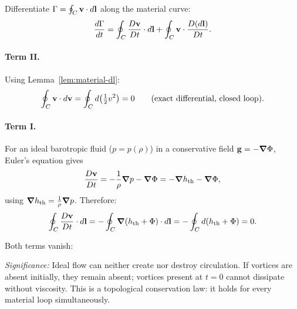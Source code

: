 \documentclass[../main.tex]{subfiles}
\begin{document}
Differentiate $\Gamma = \oint_C\mathbf{v}\cdot d\mathbf{l}$ along the material curve:
\begin{equation}
  \frac{d\Gamma}{dt}
  = \oint_C \frac{D\mathbf{v}}{Dt}\cdot d\mathbf{l}
  + \oint_C \mathbf{v}\cdot\frac{D(d\mathbf{l})}{Dt}.
  \label{eq:lec14_dGdt}
\end{equation}

\paragraph{Term II.} Using Lemma~\ref{lem:material-dl}:
\begin{equation}
  \oint_C \mathbf{v}\cdot d\mathbf{v} = \oint_C d\!\left(\tfrac{1}{2}v^2\right) = 0
  \qquad \text{(exact differential, closed loop).}
  \label{eq:lec14_term2}
\end{equation}

\paragraph{Term I.} For an ideal barotropic fluid ($p=p(\rho)$) in a conservative field $\mathbf{g}=-\grad\Phi$, Euler's equation gives
\begin{equation}
  \frac{D\mathbf{v}}{Dt} = -\frac{1}{\rho}\grad p - \grad\Phi = -\grad h_{\rm th} - \grad\Phi,
  \label{eq:lec14_euler_baro}
\end{equation}
using $\grad h_{\rm th} = \frac{1}{\rho}\grad p$. Therefore:
\begin{equation}
  \oint_C \frac{D\mathbf{v}}{Dt}\cdot d\mathbf{l}
  = -\oint_C \grad(h_{\rm th}+\Phi)\cdot d\mathbf{l}
  = -\oint_C d(h_{\rm th}+\Phi) = 0.
  \label{eq:lec14_term1}
\end{equation}

Both terms vanish:

\textit{Significance:} Ideal flow can neither create nor destroy circulation. If vortices are absent initially, they remain absent; vortices present at $t=0$ cannot dissipate without viscosity. This is a topological conservation law: it holds for every material loop simultaneously.
\end{document}
